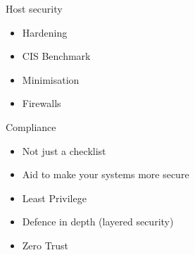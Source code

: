 \documentclass{dcpresentation}
\begin{document}
\begin{frame}{Host security}
  \begin{itemize}
  \item Hardening
  \item CIS Benchmark
  \item Minimisation
  \item Firewalls
  \end{itemize}
\end{frame}


\begin{frame}{Compliance}
  \begin{itemize}
  \item Not just a checklist
  \item Aid to make your systems more secure 
  \end{itemize}
\end{frame}



\begin{frame}
  \begin{itemize}
  \item Least Privilege
  \item Defence in depth (layered security)
  \item Zero Trust
  \end{itemize}
\end{frame}
\end{document}
